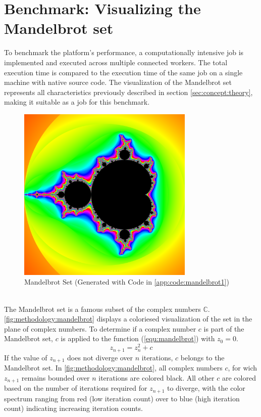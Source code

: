 \section{Benchmark: Visualizing the Mandelbrot set}
\label{sec:methodology:benchmark}
To benchmark the platform's performance, a computationally intensive job is implemented and executed across multiple connected workers. The total execution time is compared to the execution time of the same job on a single machine with native source code. The visualization of the Mandelbrot set represents all characteristics previously described in section \ref{sec:concept:theory}, making it suitable as a job for this benchmark.
\begin{figure}[htbp]
  \centering
  \includegraphics[width=0.75\textwidth]{gfx/figures/mandelbrot.png}
  \caption{Mandelbrot Set (Generated with Code in \autoref{app:code:mandelbrot1})}
  \label{fig:methodology:mandelbrot}
\end{figure}
~\\
The Mandelbrot set is a famous subset of the complex numbers $\mathbb{C}$. \autoref{fig:methodology:mandelbrot} displays a coloriesed visualization of the set in the plane of complex numbers. To determine if a complex number $c$ is part of the Mandelbrot set, $c$ is applied to the function (\ref{equ:mandelbrot}) with $z_{0}=0$.
\begin{equation}
  z_{n+1} = z_{n}^2 + c
  \label{equ:mandelbrot}
\end{equation}
If the value of $z_{n+1}$ does not diverge over $n$ iterations, $c$ belongs to the Mandelbrot set. In \autoref{fig:methodology:mandelbrot}, all complex numbers $c$, for wich $z_{n+1}$ remains bounded over $n$ iterations are colored black. All other $c$ are colored based on the number of iterations required for $z_{n+1}$ to diverge, with the color spectrum ranging from red (low iteration count) over to blue (high iteration count) indicating increasing iteration counts.

